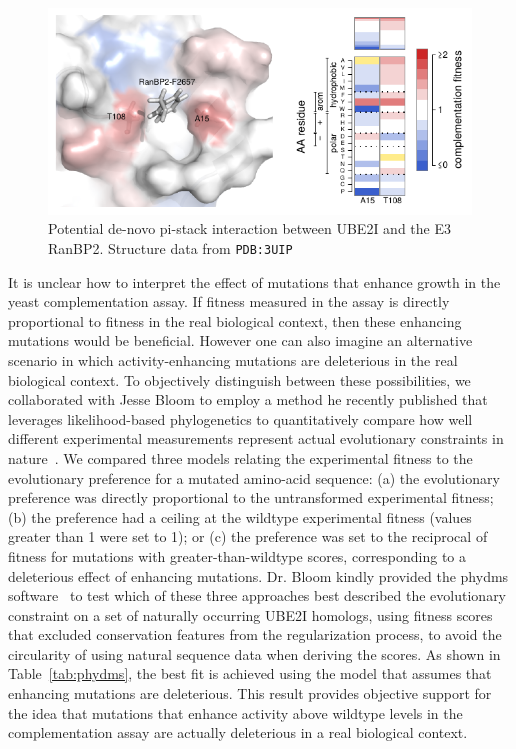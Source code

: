 \begin{figure}[h!]
	\centering
	\includegraphics[width=\textwidth]{img/pi-stack.pdf}
	\caption{Potential de-novo pi-stack interaction between UBE2I and the E3 RanBP2. Structure data from \texttt{PDB:3UIP}~\cite{gareau_determinants_2012}}
	\label{fig:pi-stack}
\end{figure}

It is unclear how to interpret the effect of mutations that enhance growth in the yeast complementation assay. If fitness measured in the assay is directly proportional to fitness in the real biological context, then these enhancing mutations would be beneficial. However one can also imagine an alternative scenario in which activity-enhancing mutations are deleterious in the real biological context. To objectively distinguish between these possibilities, we collaborated with Jesse Bloom to employ a method he recently published that leverages likelihood-based phylogenetics to quantitatively compare how well different experimental measurements represent actual evolutionary constraints in nature~\cite{bloom_experimentally_2014,bloom_identification_2017}. We compared three models relating the experimental fitness to the evolutionary preference for a mutated amino-acid sequence: (a) the evolutionary preference was directly proportional to the untransformed experimental fitness; (b) the preference had a ceiling at the wildtype experimental fitness (values greater than 1 were set to 1); or (c) the preference was set to the reciprocal of fitness for mutations with greater-than-wildtype scores, corresponding to a deleterious effect of enhancing mutations. Dr. Bloom kindly provided the phydms software~\cite{bloom_identification_2017} to test which of these three approaches best described the evolutionary constraint on a set of naturally occurring UBE2I homologs, using fitness scores that excluded conservation features from the regularization process, to avoid the circularity of using natural sequence data when deriving the scores. As shown in Table~\ref{tab:phydms}, the best fit is achieved using the model that assumes that enhancing mutations are deleterious. This result provides objective support for the idea that mutations that enhance activity above wildtype levels in the complementation assay are actually deleterious in a real biological context.

